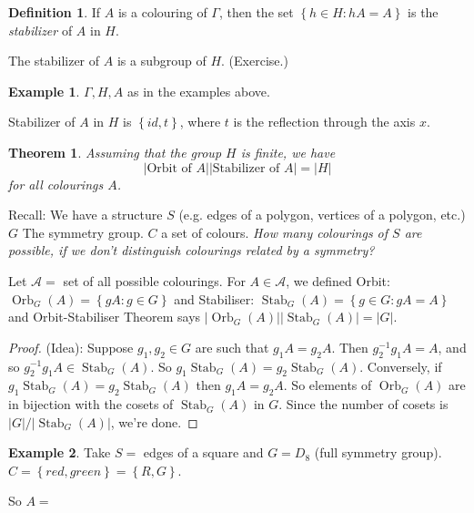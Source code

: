 \documentclass{article}
\newtheorem{theorem}{Theorem}
\theoremstyle{definition}
\newtheorem{definition}{Definition}
\newtheorem*{exmp}{Example}
\DeclareMathOperator{\Orb}{Orb}
\DeclareMathOperator{\Stab}{Stab}
\begin{document}
 \begin{definition}
   If $A$ is a colouring of $\Gamma$, then the set $\left\{ h \in H : hA=A \right\}$ is the \emph{stabilizer} of $A$ in $H$.

   The stabilizer of $A$ is a subgroup of $H$. (Exercise.)\\

   \begin{exmp}
     $\Gamma, H, A$ as in the examples above.

     Stabilizer of $A$ in $H$ is $\left\{ id,t \right\}$, where $t$ is the reflection through the axis $x$.\\
   \end{exmp}
 \end{definition}

 \begin{theorem}
   Assuming that the group $H$ is finite, we have
  \[ 
  \big|\text{Orbit of }A\big| \big|\text{Stabilizer of } A\big|=\big|H\big| \] for all colourings $A$.
  
   \label{thm:orbitstabilizer}
 \end{theorem}

 Recall: We have a structure $S$ (e.g. edges of a polygon, vertices of a polygon, etc.) $G$ The symmetry group. $C$ a set of colours. \emph{How many colourings of $S$ are possible, if we don't distinguish colourings related by a symmetry?}

 Let $\mathcal{A}=$ set of all possible colourings. For $A \in \mathcal{A}$, we defined Orbit: $\Orb_G(A)=\left\{ gA : g \in G \right\}$ and Stabiliser: $\Stab_G(A) = \left\{ g \in G : gA = A \right\}$ and Orbit-Stabiliser Theorem says $|\Orb_G(A)||\Stab_G(A)|=|G|$.

 \begin{proof}
   (Idea): Suppose $g_1,g_2\in G$ are such that $g_1A=g_2A$. Then $g_2^{-1}g_1A=A$, and so $g_2^{-1}g_1A \in \Stab_G(A)$. So $g_1\Stab_G(A)=g_2\Stab_G(A)$. Conversely, if $g_1\Stab_G(A)=g_2\Stab_G(A)$ then $g_1A=g_2A$. So elements of $\Orb_G(A)$ are in bijection with the cosets of $\Stab_G(A)$ in $G$. Since the number of cosets is $|G|/|\Stab_G(A)|$, we're done.
 \end{proof} 

 \begin{exmp}
   Take $S=$ edges of a square and $G=D_8$ (full symmetry group). $C = \left\{ red, green \right\}=\left\{ R,G \right\}$. 
   
   So
   $A=$
   \begin{figure}[h]
     \centering 
     \label{fig:coloursquare}
   \end{figure}
 
 \end{exmp}
\end{document}
